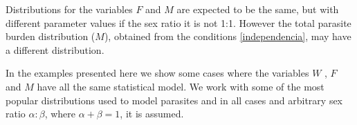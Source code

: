 \documentclass[useAMS,referee,usenatbib]{biom}
\begin{document}
Distributions for the variables $F$ and $M$ are expected to be the same, but with different parameter values if the sex ratio it is not 1:1. However the total parasite burden distribution ($M$), obtained from the conditions \eqref{independencia}, may have a different distribution. 



In the examples presented here we show some cases where the variables $W$ , $F$ and $M$ have all the same statistical model.
We work with some of the most popular distributions	used to model parasites and in all cases and arbitrary sex ratio $\alpha:\beta$, where $\alpha+\beta=1$, it is assumed. 

\end{document}
